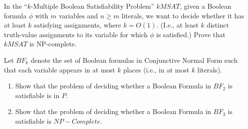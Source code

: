 \documentclass{common/cs157}
\begin{document}
\homeworkhandin

\begin{problem}{1}
        In the ``$k$-Multiple Boolean Satisfiability Problem'' $kMSAT$, given a Boolean formula $\phi$ with $m$ variables and $n \geq m$ literals, we want to decide whether it has at least $k$ satisfying assignments, where $k=O(1)$. (I.e., at least $k$ distinct truth-value assignments to its variable for which $\phi$ is satisfied.) Prove that $kMSAT$ is NP-complete.
\end{problem}

\newpage

\begin{problem}{2}
    Let $BF_k$ denote the set of Boolean formulas in Conjunctive Normal Form such that each variable appears in at most $k$ places (i.e., in at most $k$ literals).
\begin{enumerate}
    \item Show that the problem of deciding whether a Boolean Formula in $BF_2$ is satisfiable is in $P$.
    \item Show that the problem of deciding whether a Boolean Formula in $BF_3$ is satisfiable is $NP-Complete$.
\end{enumerate}
\end{problem}
\end{document}
